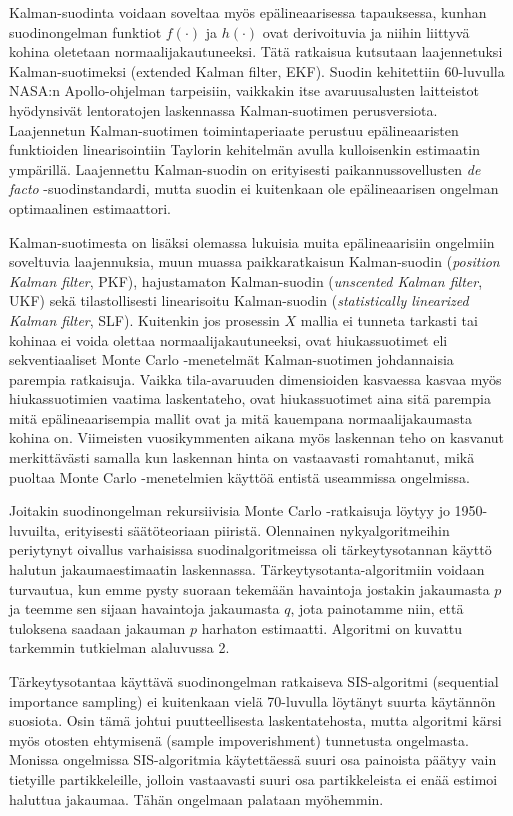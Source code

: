 \documentclass[
  12pt,
  a4paper, twoside]{book}
\begin{document}
Kalman-suodinta voidaan soveltaa myös epälineaarisessa tapauksessa, kunhan suodinongelman funktiot \(f(\cdot)\) ja \(h(\cdot)\) ovat derivoituvia ja niihin liittyvä kohina oletetaan normaalijakautuneeksi. Tätä ratkaisua kutsutaan laajennetuksi Kalman-suotimeksi (extended Kalman filter, EKF). Suodin kehitettiin 60-luvulla NASA:n Apollo-ohjelman tarpeisiin, vaikkakin itse avaruusalusten laitteistot hyödynsivät lentoratojen laskennassa Kalman-suotimen perusversiota. Laajennetun Kalman-suotimen toimintaperiaate perustuu epälineaaristen funktioiden linearisointiin Taylorin kehitelmän avulla kulloisenkin estimaatin ympärillä. Laajennettu Kalman-suodin on erityisesti paikannussovellusten \textit{de facto} -suodinstandardi, mutta suodin ei kuitenkaan ole epälineaarisen ongelman optimaalinen estimaattori.

Kalman-suotimesta on lisäksi olemassa lukuisia muita epälineaarisiin ongelmiin soveltuvia laajennuksia, muun muassa paikkaratkaisun Kalman-suodin (\emph{position Kalman filter}, PKF), hajustamaton Kalman-suodin (\emph{unscented Kalman filter}, UKF) sekä tilastollisesti linearisoitu Kalman-suodin (\emph{statistically linearized Kalman filter}, SLF). Kuitenkin jos prosessin \(X\) mallia ei tunneta tarkasti tai kohinaa ei voida olettaa normaalijakautuneeksi, ovat hiukassuotimet eli sekventiaaliset Monte Carlo -menetelmät Kalman-suotimen johdannaisia parempia ratkaisuja. Vaikka tila-avaruuden dimensioiden kasvaessa kasvaa myös hiukassuotimien vaatima laskentateho, ovat hiukassuotimet aina sitä parempia mitä epälineaarisempia mallit ovat ja mitä kauempana normaalijakaumasta kohina on. Viimeisten vuosikymmenten aikana myös laskennan teho on kasvanut merkittävästi samalla kun laskennan hinta on vastaavasti romahtanut, mikä puoltaa Monte Carlo -menetelmien käyttöä entistä useammissa ongelmissa.

Joitakin suodinongelman rekursiivisia Monte Carlo -ratkaisuja löytyy jo 1950-luvuilta, erityisesti säätöteoriaan piiristä. Olennainen nykyalgoritmeihin periytynyt oivallus varhaisissa suodinalgoritmeissa oli tärkeytysotannan käyttö halutun jakaumaestimaatin laskennassa. Tärkeytysotanta-algoritmiin voidaan turvautua, kun emme pysty suoraan tekemään havaintoja jostakin jakaumasta \(p\) ja teemme sen sijaan havaintoja jakaumasta \(q\), jota painotamme niin, että tuloksena saadaan jakauman \(p\) harhaton estimaatti. Algoritmi on kuvattu tarkemmin tutkielman alaluvussa 2.

Tärkeytysotantaa käyttävä suodinongelman ratkaiseva SIS-algoritmi (sequential importance sampling) ei kuitenkaan vielä 70-luvulla löytänyt suurta käytännön suosiota. Osin tämä johtui puutteellisesta laskentatehosta, mutta algoritmi kärsi myös otosten ehtymisenä (sample impoverishment) tunnetusta ongelmasta. Monissa ongelmissa SIS-algoritmia käytettäessä suuri osa painoista päätyy vain tietyille partikkeleille, jolloin vastaavasti suuri osa partikkeleista ei enää estimoi haluttua jakaumaa. Tähän ongelmaan palataan myöhemmin.
\end{document}
